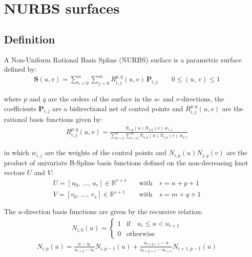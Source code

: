 \section{NURBS surfaces}

\subsection{Definition}

A Non-Uniform Rational Basis Spline (NURBS) surface is a parametric surface defined by:
\begin{align}
\label{eq:def_nurbs_surface}
\mathbf{S}(u,v)=\sum_{i=0}^{n} \sum_{j=0}^{m} R_{i,j}^{p, q}(u, v) \, \mathbf{P}_{i,j} \quad \quad 0 \leq (u, \, v) \leq 1
\end{align}

where $p$ and $q$ are the orders of the surface in the $u$- and $v$-directions, the coefficients $\mathbf{P}_{i, j}$ are a bidirectional net of control points and $R_{i,j}^{p, q}(u, v)$ are the rational basis functions given by:
\begin{align}
    R_{i,j}^{p, q}(u, v) = \frac{N_{i,p}(u)N_{j,q}(v) \, w_{i,j}}{\sum\limits_{k=0}^{n} \sum\limits_{l=0}^{m} N_{k,p}(u) N_{l,p}(v) \, w_{k, l}}
\end{align}

in which $w_{i, j}$ are the weights of the control points and $N_{i,p}(u)N_{j,q}(v)$ are the product of univariate B-Spline basis functions defined on the non-decreasing knot vectors $U$ and $V$:
\begin{align}
    U = [u_0,\, \dots,\, u_{r}] \in \mathds{R}^{r+1} \quad &\text{with} \quad r = n + p + 1 \\
    V = [v_0,\, \dots,\, v_{s}] \in \mathds{R}^{s+1} \quad &\text{with} \quad s = m + q + 1
\end{align}

The $u$-direction basis functions are given by the recursive relation:
\begin{align}
    N_{i,0}(u) =  \begin{cases}
    1& \mathrm{if} \quad u_{i}\leq u<u_{i+1}\\
    0& \mathrm{otherwise}
    \end{cases}
\end{align}
\begin{align}
\label{eq:def_bspline_recursive_2}
 N_{i,p}(u)=\frac {u-u_{i}}{u_{i+p}-u_{i}} N_{i,p-1}(u) + \frac {u_{i+p+1}-u}{u_{i+p+1}-u_{i+1}} N_{i+1,p-1}(u)
\end{align}

